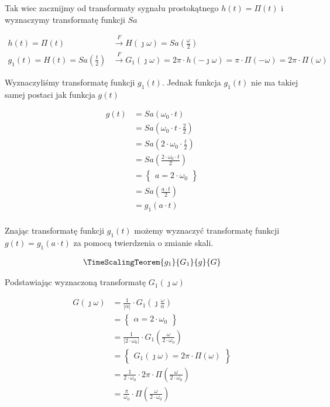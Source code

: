 \begin{task}
Tak wiec zacznijmy od transformaty sygnału prostokątnego $h(t)=\Pi(t)$ i wyznaczymy transformatę funkcji $Sa$

\begin{align*}
h(t)=\Pi(t) &\overset{F}{\rightarrow} H(\jmath \omega) = Sa\left(\frac{\omega}{2}\right)\\
g_1(t) = H(t) = Sa\left(\frac{t}{2}\right) &\overset{F}{\rightarrow} 
G_1(\jmath \omega) = 2\pi \cdot h(- \jmath \omega) = \pi \cdot  \Pi\left(-\omega\right) = 2\pi \cdot  \Pi\left(\omega\right)
\end{align*}

Wyznaczyliśmy transformatę funkcji $g_1(t)$. Jednak funkcja $g_1(t)$ nie ma takiej samej postaci jak funkcja $g(t)$ 

\begin{align*}
g(t)&=Sa\left(\omega_0 \cdot t\right)\\
&=Sa\left(\omega_0 \cdot t \cdot \frac{2}{2}\right)\\
&=Sa\left(2\cdot \omega_0 \cdot \frac{t}{2}\right)\\
&=Sa\left(\frac{2\cdot \omega_0 \cdot t}{2}\right)\\
&=\begin{Bmatrix}
a = 2\cdot \omega_0
\end{Bmatrix}\\
&=Sa\left(\frac{a\cdot t}{2}\right)\\
&=g_1(a\cdot t) \\
\end{align*}

Znając transformatę funkcji $g_1(t)$ możemy wyznaczyć transformatę funkcji $g(t)=g_1(a \cdot t)$ za pomocą twierdzenia o zmianie skali.

\begin{align*}
\TimeScalingTeorem{g_1}{G_1}{g}{G}
\end{align*}

Podstawiając wyznaczoną transformatę $G_1(\jmath \omega)$

\begin{align*}
G(\jmath \omega) &= \frac{1}{\left|\alpha \right|} \cdot G_1(\jmath \frac{\omega}{\alpha})\\
&=\begin{Bmatrix}
\alpha = 2\cdot \omega_0
\end{Bmatrix}\\
&=\frac{1}{\left| 2\cdot \omega_0 \right|} \cdot G_1( \frac{\omega}{2\cdot \omega_0})\\
&=\begin{Bmatrix}
G_1(\jmath \omega) = 2\pi \cdot \Pi\left(\omega\right)
\end{Bmatrix}\\
&=\frac{1}{ 2\cdot \omega_0 } \cdot 2\pi \cdot \Pi\left( \frac{\omega}{2\cdot \omega_0}\right)\\
&=\frac{\pi}{ \omega_0 } \cdot \Pi\left( \frac{\omega}{2\cdot \omega_0}\right)\\
\end{align*}


\end{task}
